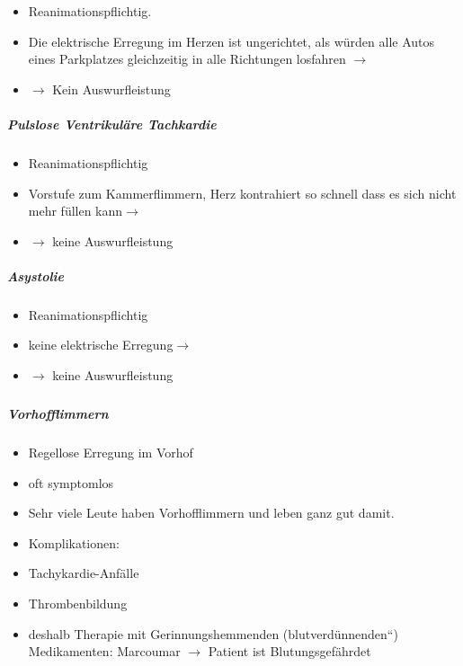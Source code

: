 \documentclass{article}
\begin{document}
\begin{itemize}
\item Reanimationspflichtig.

\item Die elektrische Erregung im Herzen ist ungerichtet, als w\"urden
alle Autos eines Parkplatzes gleichzeitig in alle Richtungen losfahren
${\rightarrow}$

\item ${\rightarrow}$ Kein Auswurfleistung 

\end{itemize}
\subparagraph{Pulslose Ventrikul\"are Tachkardie}
\begin{itemize}
\item Reanimationspflichtig 

\item Vorstufe zum Kammerflimmern, Herz kontrahiert so schnell dass es
sich nicht mehr f\"ullen kann${\rightarrow}$ 

\item ${\rightarrow}$ keine Auswurfleistung 

\end{itemize}
\subparagraph{Asystolie}
\begin{itemize}
\item Reanimationspflichtig 

\item keine elektrische Erregung${\rightarrow}$ 

\item ${\rightarrow}$ keine Auswurfleistung 

\end{itemize}
\subparagraph{}
\subparagraph[Vorhofflimmern]{Vorhofflimmern}
\begin{itemize}
\item Regellose Erregung im Vorhof

\item oft symptomlos

\item Sehr viele Leute haben Vorhofflimmern und leben ganz gut damit.

\item Komplikationen:

\end{itemize}
\begin{itemize}
\item Tachykardie-Anf\"alle

\item Thrombenbildung

\end{itemize}
\begin{itemize}
\item deshalb Therapie mit Gerinnungshemmenden
({\quotedblbase}blutverd\"unnenden{\textquotedblleft}) Medikamenten:
Marcoumar ${\rightarrow}$ Patient ist Blutungsgef\"ahrdet

\end{itemize}
\end{document}
